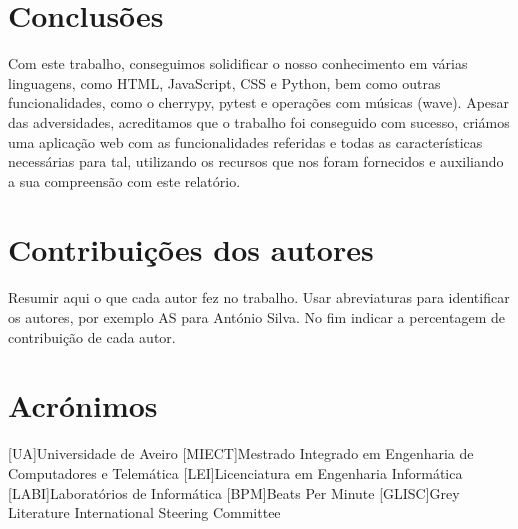 \documentclass{report}
\begin{document}
\chapter{Conclusões}
\label{chap.conclusao}
Com este trabalho, conseguimos solidificar o nosso conhecimento em várias linguagens, como HTML, JavaScript, CSS e 
Python, bem como outras funcionalidades, como o cherrypy, pytest e operações com músicas (wave).
Apesar das adversidades, acreditamos que o trabalho foi conseguido com sucesso, criámos uma aplicação 
web com as funcionalidades referidas e todas as características necessárias para tal, utilizando os recursos que 
nos foram fornecidos e auxiliando a sua compreensão com este relatório.

\chapter*{Contribuições dos autores}
Resumir aqui o que cada autor fez no trabalho.
Usar abreviaturas para identificar os autores,
por exemplo AS para António Silva.
No fim indicar a percentagem de contribuição de cada autor.

\chapter*{Acrónimos}
\begin{acronym}
[UA]{Universidade de Aveiro}
[MIECT]{Mestrado Integrado em Engenharia de Computadores e Telemática}
[LEI]{Licenciatura em Engenharia Informática}
[LABI]{Laboratórios de Informática}
[BPM]{Beats Per Minute}
[GLISC]{Grey Literature International Steering Committee}
\end{acronym}


\printbibliography
\end{document}
